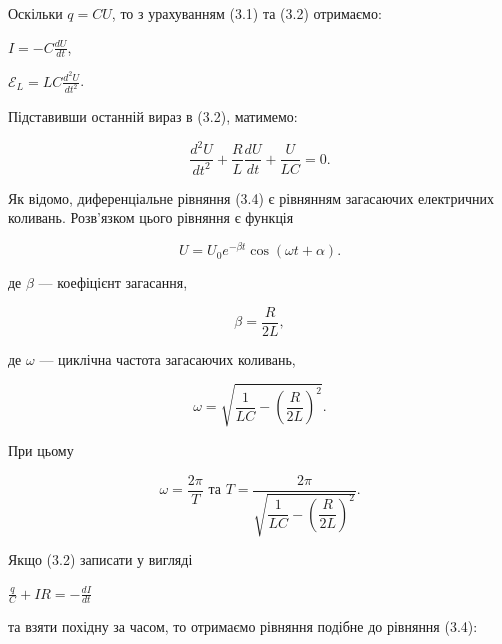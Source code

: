 \documentclass[12pt,a4paper]{article}
\begin{document}
    Оскільки $q = CU$, то з урахуванням (3.1) та (3.2) отримаємо:

    \begin{center}
        $\displaystyle I = -C \frac{dU}{dt}$,
    \end{center}

    \begin{center}
        $\displaystyle \mathcal{E}_L = LC \frac{d^2U}{dt^2}$.
    \end{center}

    Підставивши останній вираз в (3.2), матимемо:

    \begin{equation}
        \frac{d^2U}{dt^2} + \frac{R}{L} \frac{dU}{dt} + \frac{U}{LC} = 0.
        \tag{3.4}
    \end{equation}

    Як відомо, диференціальне рівняння (3.4) є рівнянням загасаючих електричних коливань.
    Розв’язком цього рівняння є функція

    \begin{equation}
        U = U_0e^{-\beta t} \cos(\omega t + \alpha).
        \tag{3.5}
    \end{equation}

    де $\beta$ --- коефіцієнт загасання,

    \begin{equation}
        \beta = \frac{R}{2L},
        \tag{3.6}
    \end{equation}

    де $\omega$ --- циклічна частота загасаючих коливань,

    \begin{equation}
        \omega = \sqrt{\frac{1}{LC} - \left( \frac{R}{2L}\right)^2}.
        \tag{3.7а}
    \end{equation}

    При цьому

    \begin{equation}
        \omega = \frac{2\pi}{T} \text{  та  } T = \frac{2\pi}{\sqrt{\dfrac{1}{LC} - \left( \dfrac{R}{2L}\right)^2}}.
        \tag{3.7б}
    \end{equation}

    Якщо (3.2) записати у вигляді

    \begin{center}
        $\displaystyle \frac{q}{C} + IR = -\frac{dI}{dt}$
    \end{center}

    та взяти похідну за часом, то отримаємо рівняння подібне до рівняння (3.4):
\end{document}
